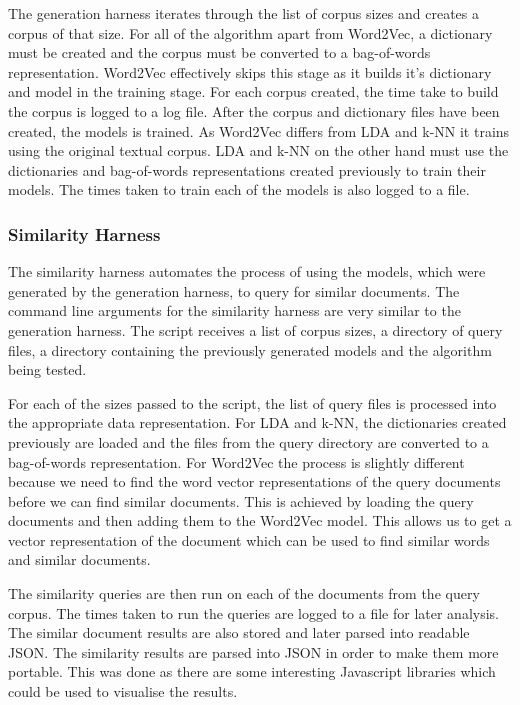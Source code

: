 The generation harness iterates through the list of corpus sizes and creates a corpus of that size.
For all of the algorithm apart from Word2Vec, a dictionary must be created and the corpus must be converted to a bag-of-words representation.
Word2Vec effectively skips this stage as it builds it's dictionary and model in the training stage.
For each corpus created, the time take to build the corpus is logged to a log file.
After the corpus and dictionary files have been created, the models is trained.
As Word2Vec differs from LDA and k-NN it trains using the original textual corpus.
LDA and k-NN on the other hand must use the dictionaries and bag-of-words representations created previously to train their models.
The times taken to train each of the models is also logged to a file.

\subsubsection{Similarity Harness}
The similarity harness automates the process of using the models, which were generated by the generation harness, to query for similar documents.
The command line arguments for the similarity harness are very similar to the generation harness.
The script receives a list of corpus sizes, a directory of query files, a directory containing the previously generated models and the algorithm being tested.

For each of the sizes passed to the script, the list of query files is processed into the appropriate data representation.
For LDA and k-NN, the dictionaries created previously are loaded and the files from the query directory are converted to a bag-of-words representation.
For Word2Vec the process is slightly different because we need to find the word vector representations of the query documents before we can find similar documents.
This is achieved by loading the query documents and then adding them to the Word2Vec model.
This allows us to get a vector representation of the document which can be used to find similar words and similar documents.

The similarity queries are then run on each of the documents from the query corpus.
The times taken to run the queries are logged to a file for later analysis.
The similar document results are also stored and later parsed into readable JSON.
The similarity results are parsed into JSON in order to make them more portable.
This was done as there are some interesting Javascript libraries which could be used to visualise the results.

